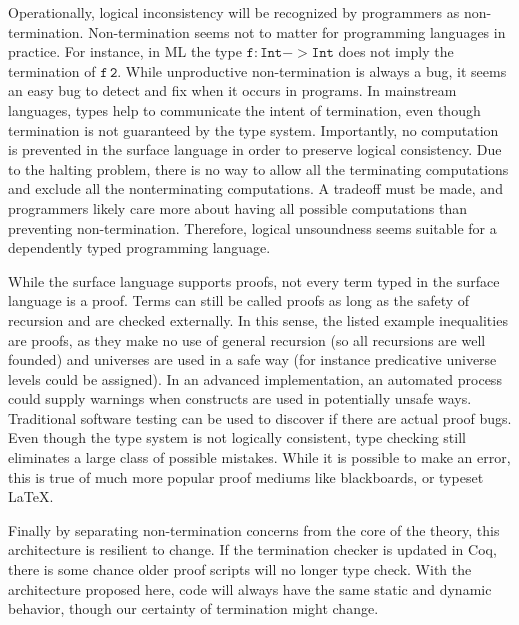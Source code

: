 Operationally, logical inconsistency will be recognized by programmers as non-termination.
Non-termination seems not to matter for programming languages in practice.
For instance, in ML the type $\mathtt{f:Int->Int}$ does not imply the termination of $\mathtt{f\,2}$.
While unproductive non-termination is always a bug, it seems an easy bug to detect and fix when it occurs in programs.
In mainstream languages, types help to communicate the intent of termination, even though termination is not guaranteed by the type system.
Importantly, no computation is prevented in the surface language in order to preserve logical consistency.
Due to the halting problem, there is no way to allow all the terminating computations and exclude all the nonterminating computations.
A tradeoff must be made, and programmers likely care more about having all possible computations than preventing non-termination.
Therefore, logical unsoundness seems suitable for a dependently typed programming language.
 
 
 
While the surface language supports proofs, not every term typed in the surface language is a proof.
Terms can still be called proofs as long as the safety of recursion and \tit{} are checked externally.
In this sense, the listed example inequalities are proofs, as they make no use of general recursion (so all recursions are well founded) and universes are used in a safe way (for instance predicative universe levels could be assigned).
In an advanced implementation, an automated process could supply warnings when constructs are used in potentially unsafe ways.
Traditional software testing can be used to discover if there are actual proof bugs.
Even though the type system is not logically consistent, type checking still eliminates a large class of possible mistakes.
While it is possible to make an error, this is true of much more popular proof mediums like blackboards, or typeset \LaTeX.
 
Finally by separating non-termination concerns from the core of the theory, this architecture is resilient to change.
If the termination checker is updated in Coq, there is some chance older proof scripts will no longer type check.
With the architecture proposed here, code will always have the same static and dynamic behavior, though our certainty of termination might change.
 
